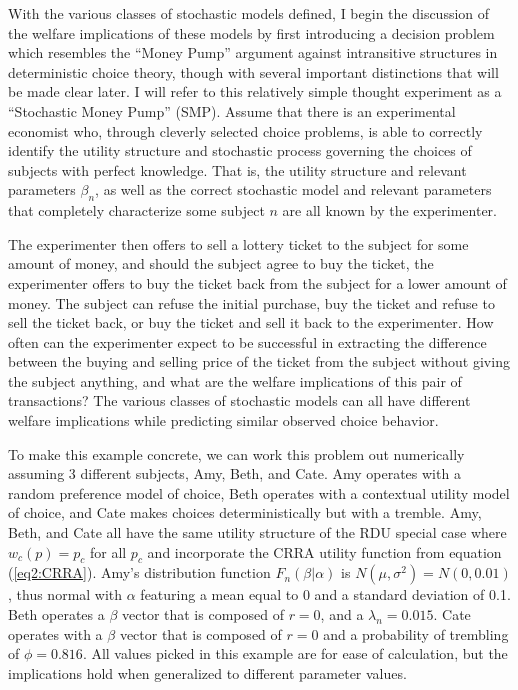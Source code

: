 \documentclass[../main.tex]{subfiles}
\begin{document}
With the various classes of stochastic models defined, I begin the discussion of the welfare implications of these models by first introducing a decision problem which resembles the \enquote{Money Pump} argument against intransitive structures in deterministic choice theory, though with several important distinctions that will be made clear later.
I will refer to this relatively simple thought experiment as a \enquote{Stochastic Money Pump} (SMP).
Assume that there is an experimental economist who, through cleverly selected choice problems, is able to correctly identify the utility structure and stochastic process governing the choices of subjects with perfect knowledge.
That is, the utility structure and relevant parameters $\beta_n$, as well as the correct stochastic model and relevant parameters that completely characterize some subject $n$ are all known by the experimenter.

The experimenter then offers to sell a lottery ticket to the subject for some amount of money, and should the subject agree to buy the ticket, the experimenter offers to buy the ticket back from the subject for a lower amount of money.
The subject can refuse the initial purchase, buy the ticket and refuse to sell the ticket back, or buy the ticket and sell it back to the experimenter.
How often can the experimenter expect to be successful in extracting the difference between the buying and selling price of the ticket from the subject without giving the subject anything, and what are the welfare implications of this pair of transactions?
The various classes of stochastic models can all have different welfare implications while predicting similar observed choice behavior.

To make this example concrete, we can work this problem out numerically assuming 3 different subjects, Amy, Beth, and Cate.
Amy operates with a random preference model of choice, Beth operates with a contextual utility model of choice, and Cate makes choices deterministically but with a tremble.
Amy, Beth, and Cate all have the same utility structure of the RDU special case where $w_c(p)=p_c$ for all $p_c$ and incorporate the CRRA utility function from equation (\ref{eq2:CRRA}).
Amy's distribution function $F_n(\beta|\alpha)$ is $N(\mu,\sigma^2) = N(0,0.01)$, thus normal with $\alpha$ featuring a mean equal to 0 and a standard deviation of 0.1.
Beth operates a $\beta$ vector that is composed of $r=0$, and a $\lambda_n = 0.015$.
Cate operates with a $\beta$ vector that is composed of $r=0$ and a probability of trembling of $\phi = 0.816$.
All values picked in this example are for ease of calculation, but the implications hold when generalized to different parameter values.
\end{document}
